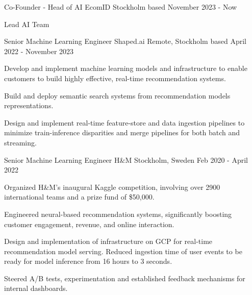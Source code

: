 

\begin{cventries}

\cventry
    {Co-Founder - Head of AI} %
    {EcomID} %
    {Stockholm based} %
    {November 2023 - Now} %
    {
        \begin{cvitems} %
        \item {Lead AI Team}
        \end{cvitems}
    }
    
\cventry
    {Senior Machine Learning Engineer} %
    {Shaped.ai} %
    {Remote, Stockholm based} %
    {April 2022 - November 2023} %
    {
        \begin{cvitems} %
        \item {Develop and implement machine learning models and infrastructure to enable customers to build highly effective, real-time recommendation systems.}
        \item {Build and deploy semantic search systems from recommendation models representations.}
        \item {Design and implement real-time feature-store and data ingestion pipelines to minimize train-inference disparities and merge pipelines for both batch and streaming.}
        \end{cvitems}
    }
    
\cventry
    {Senior Machine Learning Engineer}
    {H\&M}
    {Stockholm, Sweden}
    {Feb 2020 - April 2022}
    {
      \begin{cvitems} %
        \item {Organized H\&M's inaugural Kaggle competition, involving over 2900 international teams and a prize fund of \$50,000.}
        \item {Engineered neural-based recommendation systems, significantly boosting customer engagement, revenue, and online interaction.}
        \item {Design and implementation of infrastructure on GCP for real-time recommendation model serving. Reduced ingestion time of user events to be ready for model inference from 16 hours to 3 seconds.}
        \item {Steered A/B tests, experimentation and established feedback mechanisms for internal dashboards.}
        \end{cvitems}
    }
    

\end{cventries}
